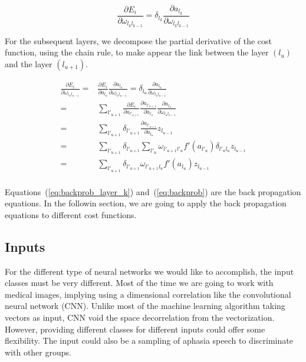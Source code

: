 \documentclass[final, paper=letter,5p,times,twocolumn]{elsarticle}
\begin{document}
\begin{equation}
  \frac{\partial E_{i}}{\partial \omega_{l_{k}l_{k-1}}} = \delta_{l_{k}}\frac{\partial a_{l_{k}}}{\partial \omega_{l_{k}l_{k-1}}} 
\label{eq:backprob_layer_k}
\end{equation}

For the subsequent layers, we decompose the partial derivative of the cost function, using the chain rule, to make appear the link between the layer $(l_{u})$ and the layer $(l_{u+1})$. 

\begin{equation}
  \begin{split}
    \frac{\partial E_{i}}{\partial \omega_{l_{u}l_{u-1}}} = &  \frac{\partial E_{i}}{\partial a_{l_{u}}} \frac{\partial a_{l_{u}}}{\partial \omega_{l_{u}l_{u-1}}} = \delta_{l_{u}} \frac{\partial a_{l_{u}}}{\partial \omega_{l_{u}l_{u-1}}}  \\
    = & \sum_{l'_{u+1}}\frac{\partial E_{i}}{\partial a_{l'_{u+1}}} \frac{\partial a_{l'_{u+1}}}{\partial a_{l_{u}}} \frac{\partial a_{l_{u}}}{\partial \omega_{l_{u}l_{u-1}}}   \\
    = & \sum_{l'_{u+1}} \delta_{l'_{u+1}} \frac{\partial a_{l'_{u+1}}}{\partial a_{l_{u}}} z_{l_{u-1}}   \\
    = & \sum_{l'_{u+1}} \delta_{l'_{u+1}} \sum_{l'_{u}} \omega_{l'_{u+1}l'_{u}} f'(a_{l'_{u}}) \delta_{l'_{u}l_{u}} z_{l_{u-1}}   \\
    = & \sum_{l'_{u+1}} \delta_{l'_{u+1}} \omega_{l'_{u+1}l_{u}} f'(a_{l_{u}}) z_{l_{u-1}}   \\
  \end{split}
\label{eq:backprob}
\end{equation}

Equations~(\ref{eq:backprob_layer_k}) and~(\ref{eq:backprob}) are the back propagation equations. In the followin section, we are going to apply the back propagation equations to different cost functions.


\subsection{Inputs}
For the different type of neural networks we would like to accomplish, the input classes must be very different. Most of the time we are going to work with medical images, implying using a dimensional correlation like the convolutional neural network (CNN). Unlike most of the machine learning algorithm taking vectors as input, CNN void the space decorrelation from the vectorization. However, providing different classes for different inputs could offer some flexibility. The input could also be a sampling of aphasia speech to discriminate with other groups.
\end{document}
